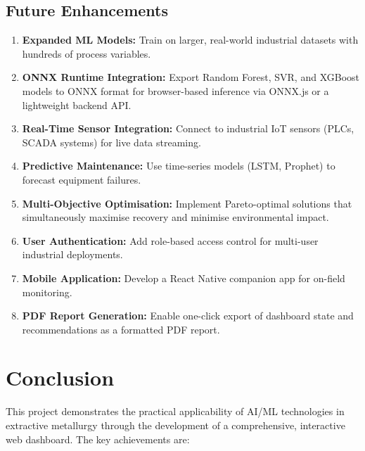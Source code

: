 \documentclass[12pt,a4paper]{report}
\begin{document}
\section{Future Enhancements}

\begin{enumerate}
  \item \textbf{Expanded ML Models:} Train on larger, real-world industrial datasets with hundreds of process variables.
  \item \textbf{ONNX Runtime Integration:} Export Random Forest, SVR, and XGBoost models to ONNX format for browser-based inference via ONNX.js or a lightweight backend API.
  \item \textbf{Real-Time Sensor Integration:} Connect to industrial IoT sensors (PLCs, SCADA systems) for live data streaming.
  \item \textbf{Predictive Maintenance:} Use time-series models (LSTM, Prophet) to forecast equipment failures.
  \item \textbf{Multi-Objective Optimisation:} Implement Pareto-optimal solutions that simultaneously maximise recovery and minimise environmental impact.
  \item \textbf{User Authentication:} Add role-based access control for multi-user industrial deployments.
  \item \textbf{Mobile Application:} Develop a React Native companion app for on-field monitoring.
  \item \textbf{PDF Report Generation:} Enable one-click export of dashboard state and recommendations as a formatted PDF report.
\end{enumerate}


\chapter{Conclusion}
\label{ch:conclusion}

This project demonstrates the practical applicability of AI/ML technologies in extractive metallurgy through the development of a comprehensive, interactive web dashboard. The key achievements are:
\end{document}
